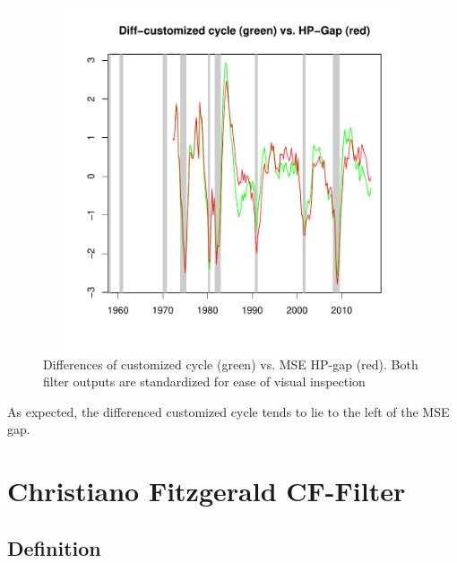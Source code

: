 \documentclass[a4paper]{book}
\begin{document}
\begin{enumerate}
\begin{figure}[H]\begin{center}\includegraphics[height=4in, width=6in]{z_HP_us_real_log_gdp_hp_bp_cust_1}\caption{Differences of customized cycle (green) vs. MSE HP-gap (red). Both filter outputs are standardized for ease of visual inspection\label{z_HP_us_real_log_gdp_hp_bp_cust_1}}\end{center}\end{figure}As expected, the differenced customized cycle tends to lie to the left of the MSE gap.
\end{enumerate}






\section{Christiano Fitzgerald CF-Filter}\label{rep_cust_cl_fi_d_cf}


\subsection{Definition}
\end{document}
